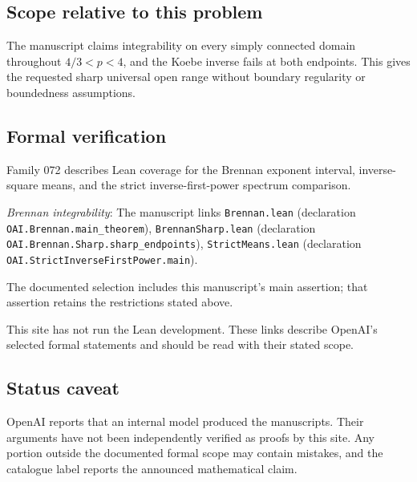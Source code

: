 \documentclass[11pt]{article}
\begin{document}
\subsection{Scope relative to this problem}
The manuscript claims integrability on every simply connected domain throughout $4/3<p<4$, and the Koebe inverse fails at both endpoints. This gives the requested sharp universal open range without boundary regularity or boundedness assumptions.

\subsection{Formal verification}
Family 072 describes Lean coverage for the Brennan exponent interval, inverse-square means, and the strict inverse-first-power spectrum comparison.

\textit{Brennan integrability}: The manuscript links \texttt{Brennan.lean} (declaration \texttt{OAI.Brennan.main\_theorem}), \texttt{BrennanSharp.lean} (declaration \texttt{OAI.Brennan.Sharp.sharp\_endpoints}), \texttt{StrictMeans.lean} (declaration \texttt{OAI.StrictInverseFirstPower.main}).

The documented selection includes this manuscript’s main assertion; that assertion retains the restrictions stated above.

This site has not run the Lean development. These links describe OpenAI’s selected formal statements and should be read with their stated scope.

\subsection{Status caveat}
OpenAI reports that an internal model produced the manuscripts. Their arguments have not been independently verified as proofs by this site. Any portion outside the documented formal scope may contain mistakes, and the catalogue label reports the announced mathematical claim.
\end{document}
